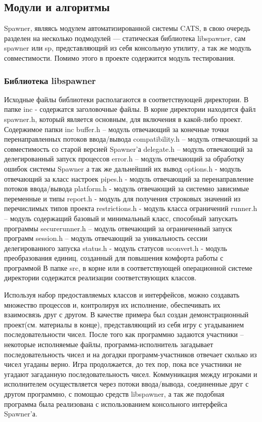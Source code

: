 \documentclass{imcs}
\begin{document}
\subsection{Модули и алгоритмы}

Spawner, являясь модулем автоматизированной системы CATS, в свою очередь разделен на несколько подмодулей — статическая библиотека libspawner, сам spawner или sp, представляющий из себя консольную утилиту, а так же модуль совместимости. Помимо этого в проекте содержится модуль тестирования.

\subsubsection{Библиотека libspawner}

Исходные файлы библиотеки располагаются в соответствующей директории.
В папке inc - содержатся заголовочные файлы. В корне директории находится файл spawner.h, который является основным, для включения в какой-либо проект.
Содержимое папки inc
buffer.h – модуль отвечающий за конечные точки перенаправленных потоков ввода/вывода
compatibility.h – модуль отвечающий за совместимость со старой версией Spawner'а
delegate.h – модуль отвечающий за делегированный запуск процессов
error.h – модуль отвечающий за обработку ошибок системы Spawner а так же дальнейший их вывод
options.h - модуль отвечающий за класс настроек
pipes.h - модуль отвечающий за перенаправление потоков ввода/вывода
platform.h - модуль отвечающий за системно зависимые переменные и типы
report.h - модуль для получения строковых значений из перечислимых типов проекта
restrictions.h - модуль класса ограничений
runner.h – модуль содержащий базовый и минимальный класс, способный запускать программы
securerunner.h – модуль отвечающий за ограниченный запуск программ
session.h – модуль отвечающий за уникальность сессии делегированного запуска
status.h - модуль статусов
uconvert.h - модуль преобразования единиц, созданный для повышения комфорта работы с программой
В папке src, в корне или в соответствующей операционной системе директории содержатся реализации соответствующих классов.

Используя набор предоставляемых классов и интерфейсов, можно создавать множество процессов и, контролируя их исполнение, обеспечивать их взаимосвязь друг с другом.
В качестве примера был создан демонстрационный проект(см. материалы в конце), представляющий из себя игру с угадыванием последовательности чисел. После того как программно задаются участники – некоторые исполняемые файлы, программа-исполнитель загадывает последовательность чисел и на догадки программ-участников отвечает сколько из чисел угаданы верно. Игра продолжается, до тех пор, пока все участники не угадают загаданную последовательность чисел. Коммуникация между игроками и исполнителем осуществляется через потоки ввода/вывода, соединенные друг с другом программно, с помощью средств libspawner, а так же подобная программа была реализована с использованием консольного интерфейса Spawner'а.
\end{document}
